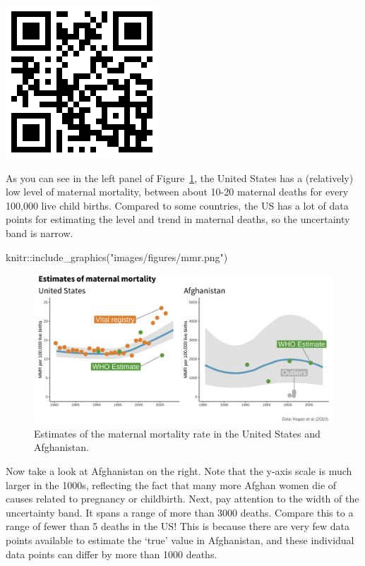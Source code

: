 \documentclass[
  letterpaper,
  DIV=11,
  numbers=noendperiod,
  oneside]{scrartcl}
\newenvironment{Shaded}{\begin{snugshade}}{\end{snugshade}}
\newcommand{\FunctionTok}[1]{\textcolor[rgb]{0.28,0.35,0.67}{#1}}
\newcommand{\NormalTok}[1]{\textcolor[rgb]{0.00,0.23,0.31}{#1}}
\newcommand{\SpecialCharTok}[1]{\textcolor[rgb]{0.37,0.37,0.37}{#1}}
\newcommand{\StringTok}[1]{\textcolor[rgb]{0.13,0.47,0.30}{#1}}
\begin{document}
\includegraphics{images/QR_hip.png}

As you can see in the left panel of Figure~\ref{fig-mmr}, the United
States has a (relatively) low level of maternal mortality, between about
10-20 maternal deaths for every 100,000 live child births. Compared to
some countries, the US has a lot of data points for estimating the level
and trend in maternal deaths, so the uncertainty band is narrow.

\begin{Shaded}
\begin{Highlighting}[]
\NormalTok{knitr}\SpecialCharTok{::}\FunctionTok{include\_graphics}\NormalTok{(}\StringTok{"images/figures/mmr.png"}\NormalTok{) }
\end{Highlighting}
\end{Shaded}

\begin{figure}[H]

{\centering \includegraphics{images/figures/mmr.png}

}

\caption{\label{fig-mmr}Estimates of the maternal mortality rate in the
United States and Afghanistan.}

\end{figure}

Now take a look at Afghanistan on the right. Note that the y-axis scale
is much larger in the 1000s, reflecting the fact that many more Afghan
women die of causes related to pregnancy or childbirth. Next, pay
attention to the width of the uncertainty band. It spans a range of more
than 3000 deaths. Compare this to a range of fewer than 5 deaths in the
US! This is because there are very few data points available to estimate
the `true' value in Afghanistan, and these individual data points can
differ by more than 1000 deaths.
\end{document}
